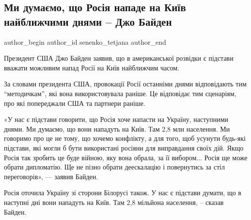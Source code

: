 
 
 
 
 
 
\subsection{Ми думаємо, що Росія нападе на Київ найближчими днями – Джо Байден}
\label{sec:19_02_2022.stz.kiev.bigkyiv.1.kiev_biden_joe}
 
\ifcmt
 author_begin
   author_id senenko_tetjana
 author_end
\fi

\begin{zznagolos}
Президент США Джо Байден заявив, що в американської розвідки є підстави вважати
можливим напад Росії на Київ найближчим часом.
\end{zznagolos}

За словами президента США, провокації Росії останніми днями відповідають тим
\enquote{методичкам}, які вона використовувала раніше. Це відповідає тим сценаріям, про
які попереджали США та партнери раніше.


\begin{zzquote}
«У нас є підстави говорити, що Росія хоче напасти на Україну, наступними днями.
Ми думаємо, що вони нападуть на Київ. Там 2,8 млн населення. Ми говоримо про це
не тому, що хочемо конфлікту, а для того, щоб усунути будь-які підстави, які
могли б бути використані росіяни для виправдання своїх дій. Якщо Росія так
зробить це буде війною, яку вона обрала, за її вибором... Росія ще може обрати
дипломатію. Ще не пізно обрати деескалацію і повернутись за стіл переговорів»,
— заявив Байден.
\end{zzquote}

Росія оточила Україну зі сторони Білорусі також. У нас є підстави думати, що в
наступні дні вони нападуть на Київ. Там 2,8 мільйона населення, – сказав
Байден.


